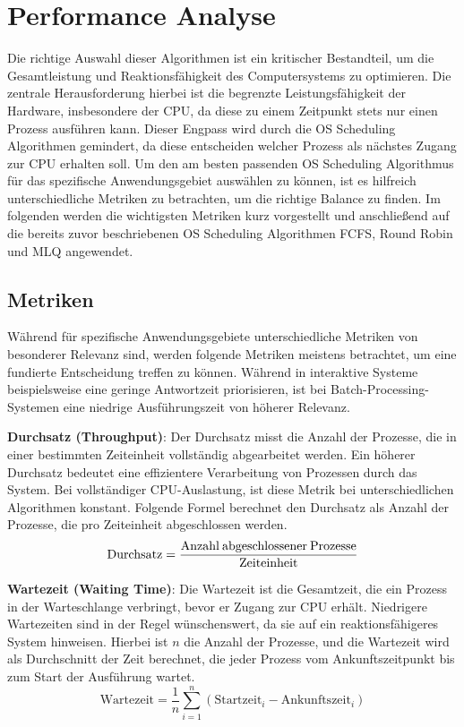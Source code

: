 \chapter{Performance Analyse}
Die richtige Auswahl dieser Algorithmen ist ein kritischer Bestandteil, um die Gesamtleistung und Reaktionsfähigkeit des Computersystems zu optimieren. Die zentrale Herausforderung hierbei ist die begrenzte Leistungsfähigkeit der Hardware, insbesondere der \ac{CPU}, da diese zu einem Zeitpunkt stets nur einen Prozess ausführen kann. Dieser Engpass wird durch die OS Scheduling Algorithmen gemindert, da diese entscheiden welcher Prozess als nächstes Zugang zur \ac{CPU} erhalten soll. Um den am besten passenden OS Scheduling Algorithmus für das spezifische Anwendungsgebiet auswählen zu können, ist es hilfreich unterschiedliche Metriken zu betrachten, um die richtige Balance zu finden. Im folgenden werden die wichtigsten Metriken kurz vorgestellt und anschließend auf die bereits zuvor beschriebenen OS Scheduling Algorithmen \ac{FCFS}, Round Robin und \ac{MLQ} angewendet. 

\section{Metriken}
Während für spezifische Anwendungsgebiete unterschiedliche Metriken von besonderer Relevanz sind, werden folgende Metriken meistens betrachtet, um eine fundierte Entscheidung treffen zu können. Während in interaktive Systeme beispielsweise eine geringe Antwortzeit priorisieren, ist bei Batch-Processing-Systemen eine niedrige Ausführungszeit von höherer Relevanz.


\textbf{Durchsatz (Throughput)}: Der Durchsatz misst die Anzahl der Prozesse, die in einer bestimmten Zeiteinheit vollständig abgearbeitet werden. Ein höherer Durchsatz bedeutet eine effizientere Verarbeitung von Prozessen durch das System. Bei vollständiger \ac{CPU}-Auslastung, ist diese Metrik bei unterschiedlichen Algorithmen konstant. Folgende Formel berechnet den Durchsatz als Anzahl der Prozesse, die pro Zeiteinheit abgeschlossen werden.
\[ \text{Durchsatz} = \frac{\text{Anzahl\:abgeschlossener\:Prozesse}}{\text{Zeiteinheit}} \]


\textbf{Wartezeit (Waiting Time)}: Die Wartezeit ist die Gesamtzeit, die ein Prozess in der Warteschlange verbringt, bevor er Zugang zur \ac{CPU} erhält. Niedrigere Wartezeiten sind in der Regel wünschenswert, da sie auf ein reaktionsfähigeres System hinweisen. Hierbei ist \( n \) die Anzahl der Prozesse, und die Wartezeit wird als Durchschnitt der Zeit berechnet, die jeder Prozess vom Ankunftszeitpunkt bis zum Start der Ausführung wartet.
\[ \text{Wartezeit} = \frac{1}{n} \sum_{i=1}^{n} (\text{Startzeit}_i - \text{Ankunftszeit}_i) \]


